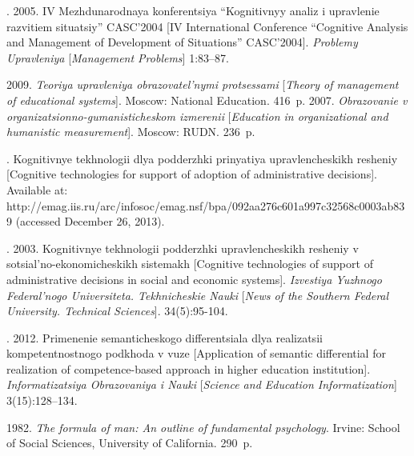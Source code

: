 

  \begin{multicols}{2}

\renewcommand{\bibname}{\protect\rmfamily References}

{\small\frenchspacing
{%
\begin{thebibliography}{9}
. 2005. 
IV Mezhdunarodnaya konferentsiya ``Kognitivnyy analiz i upravlenie razvitiem situatsiy'' 
CASC'2004 [IV International Conference ``Cognitive Analysis and Management of Development 
of Situations'' CASC'2004].  \textit{Problemy Upravleniya} [\textit{Management Problems}]
1:83--87.

 2009. \textit{Teoriya upravleniya obrazovatel'nymi 
protsessami} [\textit{Theory of management of educational systems}]. 
Moscow:  National Education.  416~p. 
 2007. \textit{Obrazovanie v organizatsionno-gumanisticheskom izmerenii} 
[\textit{Education in organizational and humanistic measurement}]. Moscow: RUDN. 236~p.

. 
Kognitivnye tekhnologii dlya podderzhki prinyatiya upravlencheskikh resheniy 
[Cognitive technologies for support of adoption of administrative decisions]. 
Available at: 
{\sf http://emag.iis.ru/arc/infosoc/emag.nsf/bpa/\linebreak 092aa276c601a997c32568c0003ab839} 
(accessed December 26, 2013).

. 
2003. Kognitivnye tekhnologii podderzhki upravlencheskikh 
resheniy v sotsial'no-ekonomicheskikh sistemakh 
[Cognitive technologies of support of administrative decisions in social 
and economic systems]. \textit{Izvestiya Yuzhnogo Federal'nogo Universiteta. 
Tekhnicheskie Nauki} [\textit{News of the Southern Federal University. Technical Sciences}]. 
34(5):95-104.

. 
2012. Primenenie semanticheskogo differentsiala dlya rea\-li\-za\-tsii 
kompetentnostnogo podkhoda v vuze 
[Application of semantic differential for realization of competence-based approach 
in higher education institution]. 
\textit{Informatizatsiya Obrazovaniya i Nauki} [\textit{Science and Education Informatization}] 3(15):128--134.

 1982. \textit{The formula of man: An outline of fundamental psychology}. 
Irvine: School of Social Sciences, University of California. 290~p. 

\end{thebibliography}
} }


\end{multicols}

